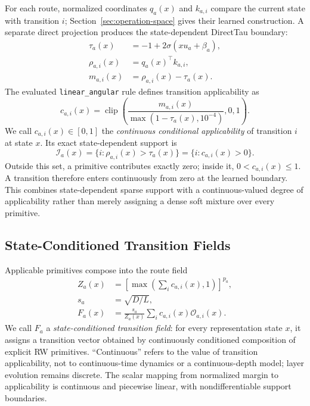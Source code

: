 \documentclass{article}
\newcommand{\op}{\mathcal{O}}
\begin{document}
For each route, normalized coordinates \(q_a(x)\) and \(k_{a,i}\) compare the
current state with transition \(i\); Section~\ref{sec:operation-space} gives
their learned construction. A separate direct projection produces the
state-dependent DirectTau boundary:
\begin{align}
\tau_a(x)&=-1+2\sigma(xu_a+\beta_a),\\
\rho_{a,i}(x)&=q_a(x)^\top k_{a,i},\\
m_{a,i}(x)&=\rho_{a,i}(x)-\tau_a(x).
\label{eq:directtau}
\end{align}
The evaluated \texttt{linear\_angular} rule defines transition applicability as
\begin{equation}
c_{a,i}(x)=
\operatorname{clip}\!\left(
\frac{m_{a,i}(x)}
{\max(1-\tau_a(x),10^{-4})},0,1\right).
\label{eq:angular_gate}
\end{equation}
We call \(c_{a,i}(x)\in[0,1]\) the \emph{continuous conditional
applicability} of transition \(i\) at state \(x\). Its exact state-dependent
support is
\begin{equation}
\mathcal{I}_a(x)=\{i:\rho_{a,i}(x)>\tau_a(x)\}
=\{i:c_{a,i}(x)>0\}.
\label{eq:applicable_support}
\end{equation}
Outside this set, a primitive contributes exactly zero; inside it,
\(0<c_{a,i}(x)\leq1\). A transition therefore enters continuously from zero at
the learned boundary. This combines state-dependent sparse support with a
continuous-valued degree of applicability rather than merely assigning a dense
soft mixture over every primitive.

\subsection{State-Conditioned Transition Fields}
\label{sec:transition-fields}

Applicable primitives compose into the route field
\begin{align}
Z_a(x)&=\left[\max\!\left(\sum_i c_{a,i}(x),1\right)\right]^{p_a},\\
s_a&=\sqrt{D/L},\nonumber\\
F_a(x)&=\frac{s_a}{Z_a(x)}
\sum_i c_{a,i}(x)\op_{a,i}(x).
\label{eq:implemented_composition}
\end{align}
We call \(F_a\) a \emph{state-conditioned transition field}: for every
representation state \(x\), it assigns a transition vector obtained by
continuously conditioned composition of explicit RW primitives. ``Continuous''
refers to the value of transition applicability, not to continuous-time
dynamics or a continuous-depth model; layer evolution remains discrete. The
scalar mapping from normalized margin to applicability is continuous and
piecewise linear, with nondifferentiable support boundaries.
\end{document}
